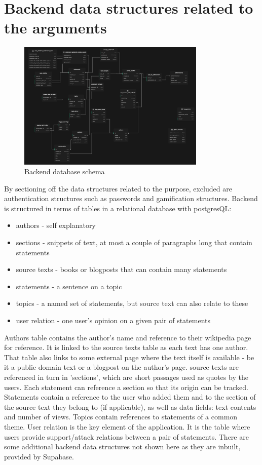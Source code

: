 \documentclass{report}
\begin{document}
\section{Backend data structures related to the arguments}

\begin{figure}[h]
    \centering
    \includegraphics[width=0.8\textwidth]{./images/Supabase-Schema-2.png}
    \caption{Backend database schema}
\end{figure}

By sectioning off the data structures related to the purpose, excluded are authentication structures such as passwords and gamification structures.
Backend is structured in terms of tables in a relational database with postgresQL:
\begin{itemize}
  \item authors - self explanatory
  \item sections - snippets of text, at most a couple of paragraphs long that contain statements
  \item source texts - books or blogposts that can contain many statements
  \item statements - a sentence on a topic
  \item topics - a named set of statements, but source text can also relate to these
  \item user relation - one user's opinion on a given pair of statements
\end{itemize}
Authors table contains the author's name and reference to their wikipedia page for reference. It is linked to the source texts table as each text has one author. That table also links to some external page where the text itself is available - be it a public domain text or a blogpost on the author's page. source texts are referenced in turn in 'sections', which are short passages used as quotes by the users.
Each statement can reference a section so that its origin can be tracked. Statements contain a reference to the user who added them and to the section of the source text they belong to (if applicable), as well as data fields: text contents and number of views. Topics contain references to statements of a common theme.
User relation is the key element of the application. It is the table where users provide support/attack relations between a pair of statements. 
There are some additional backend data structures not shown here as they are inbuilt, provided by Supabase.
\end{document}
